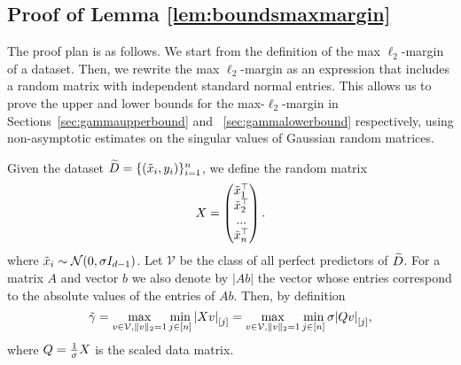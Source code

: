 \subsection{Proof of Lemma \ref{lem:boundsmaxmargin}}
\label{sec:boundsmaxmargin}

The proof plan is as follows. We start from the definition of the max
$\ell_2$-margin of a dataset. Then, we rewrite the
max $\ell_2$-margin as an expression that includes a random matrix with independent
standard normal entries. This allows us to prove the upper and lower bounds for the
max-$\ell_2$-margin in Sections~\ref{sec:gammaupperbound} and ~\ref{sec:gammalowerbound}
respectively, using non-asymptotic estimates on the singular values of
Gaussian random matrices.

Given the dataset $\widetilde{D} =  \{(\tilde{x}_i, y_i)\}_{i=1}^{n}$, we define the random matrix
\begin{equation}
\label{eq:randmatrixsamples}
X = \begin{pmatrix}
\tilde{x}_1^{\top}\\
\tilde{x}_2^{\top}\\
...\\
\tilde{x}_{n}^{\top}
\end{pmatrix}.
\end{equation}
where $\tilde{x}_i \sim \mathcal{N}(0,\sigma I_{d-1})$. 
Let $\mathcal{V}$ be the class of all perfect predictors of $\widetilde{D}$. For a matrix $A$ and vector $b$ we also denote by $|Ab|$ the vector whose entries correspond to the absolute values of the entries of $Ab$. 
Then, by definition
\begin{equation}
\label{maxmargindefgammaproof}
\tilde{\gamma} = \max_{v \in \mathcal{V}, \|v\|_2=1} \min_{j \in [n]} {|X v|}_{[j]} = \max_{v \in \mathcal{V}, \|v\|_2=1} \min_{j \in [n]} \sigma {|Qv|}_{[j]},
\end{equation}
where $Q = \frac{1}{\sigma} X$ is the scaled data matrix.

